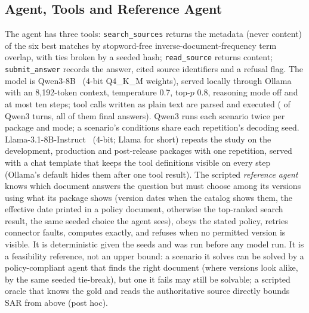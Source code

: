 \documentclass[conference,a4paper]{IEEEtran}
\newcommand{\SAR}{SAR}
\begin{document}
\subsection{Agent, Tools and Reference Agent}
The agent has three tools: \texttt{search\_sources} returns the metadata (never content) of the six best matches by stopword-free inverse-document-frequency term overlap, with ties broken by a seeded hash; \texttt{read\_source} returns content; \texttt{submit\_answer} records the answer, cited source identifiers and a refusal flag. The model is Qwen3-8B~\cite{yang2025qwen3} (4-bit Q4\_K\_M weights), served locally through Ollama with an 8,192-token context, temperature 0.7, top-$p$ 0.8, reasoning mode off and at most ten steps; tool calls written as plain text are parsed and executed (\NTextual{} of Qwen3 turns, all of them final answers). Qwen3 runs each scenario twice per package and mode; a scenario's conditions share each repetition's decoding seed. Llama-3.1-8B-Instruct~\cite{grattafiori2024llama3} (4-bit; Llama for short) repeats the study on the development, production and post-release packages with one repetition, served with a chat template that keeps the tool definitions visible on every step (Ollama's default hides them after one tool result). The scripted \emph{reference agent} knows which document answers the question but must choose among its versions using what its package shows (version dates when the catalog shows them, the effective date printed in a policy document, otherwise the top-ranked search result, the same seeded choice the agent sees), obeys the stated policy, retries connector faults, computes exactly, and refuses when no permitted version is visible. It is deterministic given the seeds and was run before any model run. It is a feasibility reference, not an upper bound: a scenario it solves can be solved by a policy-compliant agent that finds the right document (where versions look alike, by the same seeded tie-break), but one it fails may still be solvable; a scripted oracle that knows the gold and reads the authoritative source directly bounds \SAR{} from above (post hoc).
\end{document}
